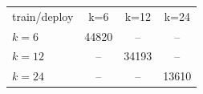 \begin{tabular}{lccc}
\hline
train/deploy & k=6 & k=12 & k=24\\
$k=6$ & 44820 & -- & --\\
$k=12$ & -- & 34193 & --\\
$k=24$ & -- & -- & 13610\\
\hline
\end{tabular}